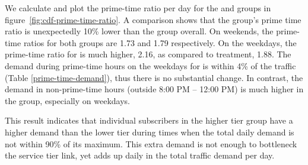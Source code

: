 We calculate and plot the prime-time ratio per day for the \treatment{} and
\control{} groups in figure~\ref{fig:cdf-prime-time-ratio}. A comparison shows 
that the \treatment{} group's prime time ratio is unexpectedly 10\% lower than the 
\control{} group overall. On weekends, the prime-time ratios for both groups are
1.73 and 1.79 respectively. On the weekdays, the prime-time ratio for \control{}
is much higher, 2.16, as compared to treatment, 1.88. The demand
during prime-time hours on the weekdays for \treatment{} is within 4\% of
the \control{} traffic (Table \ref{prime-time-demand}), thus there is no substantial
change. In contrast, the demand in non-prime-time hours (outside 8:00 PM -- 12:00 PM)
is much higher in the \treatment{} group, especially on weekdays. 

This result indicates that individual subscribers in the higher tier group have a higher
demand than the lower tier during times when the total daily demand is not within 90\% of its
maximum. This extra demand is not enough to bottleneck the service tier link, yet adds up
daily in the total traffic demand per day.

